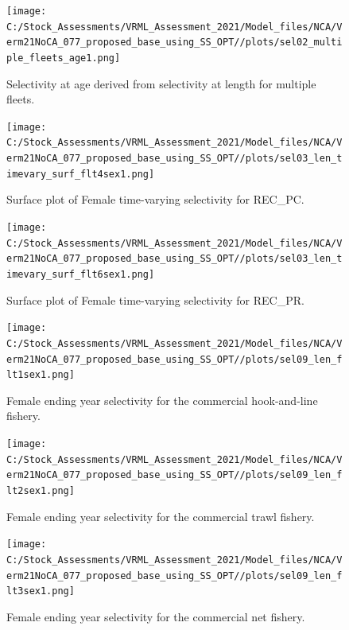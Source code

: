\documentclass[
  english,
  a4paper,
]{article}
\begin{document}
\begin{figure}
\centering
\texttt{[image: C:/Stock\_Assessments/VRML\_Assessment\_2021/Model\_files/NCA/Verm21NoCA\_077\_proposed\_base\_using\_SS\_OPT//plots/sel02\_multiple\_fleets\_age1.png]}
\caption{Selectivity at age derived from selectivity at length for multiple fleets.\label{fig:selex-age-all}}
\end{figure}

\begin{figure}
\centering
\texttt{[image: C:/Stock\_Assessments/VRML\_Assessment\_2021/Model\_files/NCA/Verm21NoCA\_077\_proposed\_base\_using\_SS\_OPT//plots/sel03\_len\_timevary\_surf\_flt4sex1.png]}
\caption{Surface plot of Female time-varying selectivity for REC\_PC.\label{fig:sel03_len_timevary_surf_flt4sex1}}
\end{figure}

\begin{figure}
\centering
\texttt{[image: C:/Stock\_Assessments/VRML\_Assessment\_2021/Model\_files/NCA/Verm21NoCA\_077\_proposed\_base\_using\_SS\_OPT//plots/sel03\_len\_timevary\_surf\_flt6sex1.png]}
\caption{Surface plot of Female time-varying selectivity for REC\_PR.\label{fig:sel03_len_timevary_surf_flt6sex1}}
\end{figure}

\FloatBarrier

\FloatBarrier

\begin{figure}
\centering
\texttt{[image: C:/Stock\_Assessments/VRML\_Assessment\_2021/Model\_files/NCA/Verm21NoCA\_077\_proposed\_base\_using\_SS\_OPT//plots/sel09\_len\_flt1sex1.png]}
\caption{Female ending year selectivity for the commercial hook-and-line fishery.\label{fig:endyr-selex-COM-HKL}}
\end{figure}

\begin{figure}
\centering
\texttt{[image: C:/Stock\_Assessments/VRML\_Assessment\_2021/Model\_files/NCA/Verm21NoCA\_077\_proposed\_base\_using\_SS\_OPT//plots/sel09\_len\_flt2sex1.png]}
\caption{Female ending year selectivity for the commercial trawl fishery.\label{fig:endyr-selex-COM-TWL}}
\end{figure}

\begin{figure}
\centering
\texttt{[image: C:/Stock\_Assessments/VRML\_Assessment\_2021/Model\_files/NCA/Verm21NoCA\_077\_proposed\_base\_using\_SS\_OPT//plots/sel09\_len\_flt3sex1.png]}
\caption{Female ending year selectivity for the commercial net fishery.\label{fig:endyr-selex-COM-NET}}
\end{figure}
\end{document}
